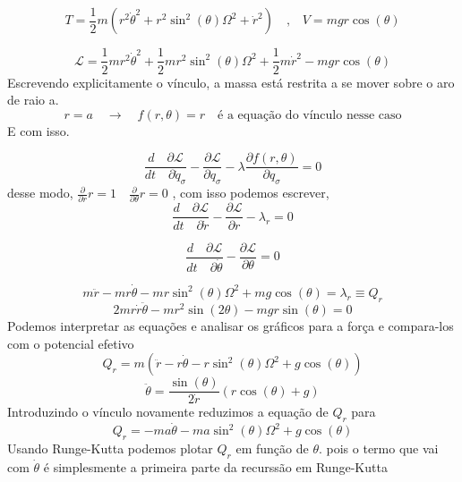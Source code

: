 \documentclass[a4paper,11pt]{exam}
\begin{document}
	\[ T = \frac{1}{2} m(r^2 \dot\theta^2 + r^2 \sin^2(\theta) \Omega^2 + \dot r^2) \quad \text{,} \quad V = mgr\cos{(\theta)}\]
	
	\[\mathcal{L} = \frac{1}{2}mr^2 \dot\theta^2 + \frac{1}{2}mr^2 \sin^2(\theta) \Omega^2 + \frac{1}{2} m \dot r^2 - mgr\cos{(\theta)} \]
	Escrevendo explicitamente o vínculo, a massa está restrita a se mover sobre o aro de raio a.
	\[ r = a \quad \to \quad f(r,\theta) = r \quad \text{é a equação do vínculo nesse caso} \]
	E com isso.

	\[ \frac{d \quad \partial \mathcal{L}}{dt\quad \partial \dot q_\sigma} - \frac{\partial \mathcal{L}}{\partial q_\sigma}  - \lambda \frac{\partial f(r,\theta)}{\partial q_\sigma} =0 \]
	desse modo, $\frac{\partial}{\partial r} r = 1 \quad \frac{\partial}{\partial \theta} r = 0$ , com isso podemos escrever, 
	\[\frac{d \quad \partial \mathcal{L}}{dt\quad \partial \dot r} - \frac{\partial \mathcal{L}}{\partial r}  - \lambda_r = 0  \]
	
	\[\frac{d \quad \partial \mathcal{L}}{dt\quad \partial \dot \theta} - \frac{\partial \mathcal{L}}{\partial \theta} = 0  \]
	
	\[ m \ddot r  - mr\dot \theta -mr\sin^2(\theta) \Omega^2 + mg\cos(\theta) = \lambda_r \equiv Q_r\]
	\[ 2m r \dot r \ddot \theta  - mr^2\sin(2 \theta) -mgr\sin(\theta) = 0\]
	Podemos interpretar as equações e analisar os gráficos para a força e compara-los com o potencial efetivo
	\[ Q_r = m( \ddot r  - r\dot \theta - r\sin^2(\theta) \Omega^2 + g\cos(\theta) ) \]
	\[ \ddot \theta = \frac{\sin(\theta)}{2 \dot r} (r \cos(\theta) + g)\]
	Introduzindo o vínculo novamente reduzimos a equação de $Q_r$ para
	\[ Q_r = -ma \dot \theta -ma\sin^2(\theta)\Omega^2 + g \cos(\theta) \]
	Usando Runge-Kutta podemos plotar $Q_r$ em função de $\theta$. pois o termo que vai com $\dot \theta$ é simplesmente a primeira parte da recurssão em Runge-Kutta
	
\end{document}
